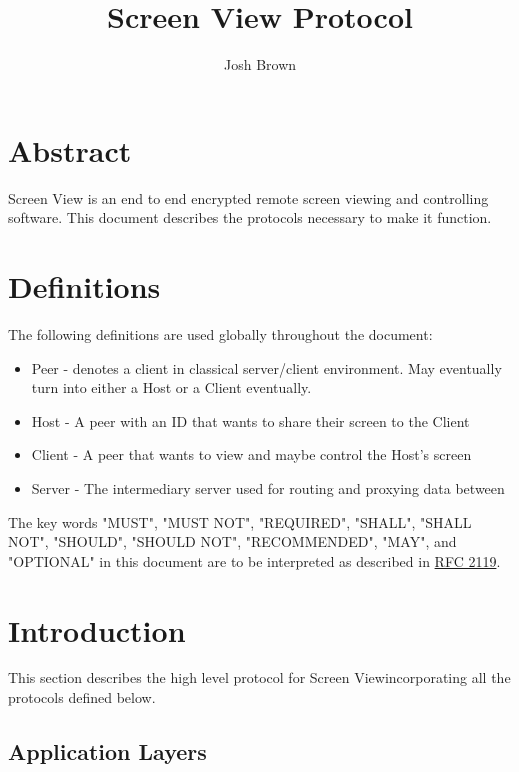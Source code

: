\documentclass{article}
\title{Screen View Protocol}
\author{Josh Brown}
\newcommand{\projectName}{Screen View}
\begin{document}
    \maketitle
    \newpage


    \section{Abstract}
    \projectName{} is an end to end encrypted remote screen viewing and controlling software. This document describes
    the protocols necessary to make it function.
    \newpage


    \tableofcontents
    \newpage


    \section{Definitions}
    The following definitions are used globally throughout the document:

    \begin{itemize}
        \item Peer - denotes a client in classical server/client environment. May eventually turn into either a Host
        or a Client eventually.
        \item Host - A peer with an ID that wants to share their screen to the Client
        \item Client - A peer that wants to view and maybe control the Host's screen
        \item Server - The intermediary server used for routing and proxying data between
    \end{itemize}


    The key words "MUST", "MUST NOT", "REQUIRED", "SHALL", "SHALL NOT",
    "SHOULD", "SHOULD NOT", "RECOMMENDED", "MAY", and "OPTIONAL" in this
    document are to be interpreted as described in \href{https://datatracker.ietf.org/doc/html/rfc2119}{RFC 2119}.

    \newpage


    \section{Introduction}

    This section describes the high level protocol for \projectName incorporating all the protocols defined below.\\

    \subsection{Application Layers}
\end{document}
